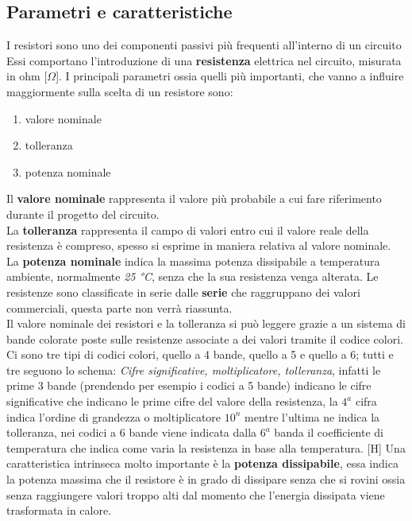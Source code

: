 \documentclass{article}
\begin{document}
\subsection{Parametri e caratteristiche}
I resistori sono uno dei componenti passivi più frequenti all'interno di un circuito\\
Essi comportano l'introduzione di una \textbf{resistenza} elettrica nel circuito, misurata in ohm [$\Omega$].
I principali parametri ossia quelli più importanti, che vanno a influire maggiormente sulla scelta di un resistore sono:\\
\begin{enumerate}
    \item valore nominale
    \item tolleranza
    \item potenza nominale
\end{enumerate}
Il \textbf{valore nominale} rappresenta il valore più probabile a cui fare riferimento durante il progetto del circuito.\\
La \textbf{tolleranza} rappresenta il campo di valori entro cui il valore reale della resistenza è compreso, spesso si esprime in maniera relativa al valore nominale.\\
La \textbf{potenza nominale} indica la massima potenza dissipabile a temperatura ambiente, normalmente \textit{25 °C}, senza che la sua resistenza venga alterata.
Le resistenze sono classificate in serie dalle \textbf{serie} che raggruppano dei valori commerciali, questa parte non verrà riassunta.\\
\vspace{1\baselineskip} 
Il valore nominale dei resistori e la tolleranza si può leggere grazie a un sistema di bande colorate poste sulle resistenze associate a dei valori tramite il codice colori.\\
Ci sono tre tipi di codici colori, quello a 4 bande, quello a 5 e quello a 6; tutti e tre seguono lo schema: \emph{Cifre significative, moltiplicatore, tolleranza}, infatti le prime 3 bande (prendendo per esempio i codici a 5 bande) indicano le cifre significative che indicano le prime cifre del valore della resistenza, la $4^a$ cifra indica l'ordine di grandezza o moltiplicatore $10^n$ mentre l'ultima ne indica la tolleranza, nei codici a 6 bande viene indicata dalla $6^a$ banda il coefficiente di temperatura che indica come varia la resistenza in base alla temperatura.
\vspace{\baselineskip}[H]
Una caratteristica intrinseca molto importante è la  \textbf{potenza dissipabile}, essa indica la potenza massima che il resistore è in grado di dissipare senza che si rovini ossia senza raggiungere valori troppo alti dal momento che l'energia dissipata viene trasformata in calore.\\
\end{document}
